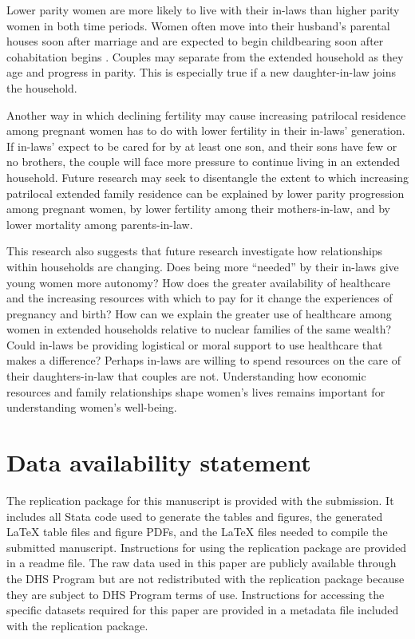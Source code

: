\documentclass[10pt,twoside,reqno]{article}
\begin{document}
Lower parity women are more likely to live with their in-laws than higher parity women in both time periods.  Women often move into their husband's parental houses soon after marriage \citep{breton2021modernisation} and are expected to begin childbearing soon after cohabitation begins \citep{ibarra2020desire}. Couples may separate from the extended household as they age and progress in parity. This is especially true if a new daughter-in-law joins the household.  

Another way in which declining fertility may cause increasing patrilocal residence among pregnant women has to do with lower fertility in their in-laws' generation.  If in-laws' expect to be cared for by at least one son, and their sons have few or no brothers, the couple will face more pressure to continue living in an extended household.  Future research may seek to disentangle the extent to which increasing patrilocal extended family residence can be explained by lower parity progression among pregnant women, by lower fertility among their mothers-in-law, and by lower mortality among parents-in-law. 

This research also suggests that future research investigate how relationships within households are changing. Does being more ``needed'' by their in-laws give young women more autonomy?  How does the greater availability of healthcare and the increasing resources with which to pay for it change the experiences of pregnancy and birth?  How can we explain the greater use of healthcare among women in extended households relative to nuclear families of the same wealth?  Could in-laws be providing logistical or moral support to use healthcare that makes a difference?  Perhaps in-laws are willing to spend resources on the care of their daughters-in-law that couples are not.  Understanding how economic resources and family relationships shape women's lives remains important for understanding women's well-being. 


\section{Data availability statement}

The replication package for this manuscript is provided with the submission. It includes all Stata code used to generate the tables and figures, the generated LaTeX table files and figure PDFs, and the LaTeX files needed to compile the submitted manuscript. Instructions for using the replication package are provided in a readme file. The raw data used in this paper are publicly available through the DHS Program but are not redistributed with the replication package because they are subject to DHS Program terms of use. Instructions for accessing the specific datasets required for this paper are provided in a metadata file included with the replication package.
\end{document}

